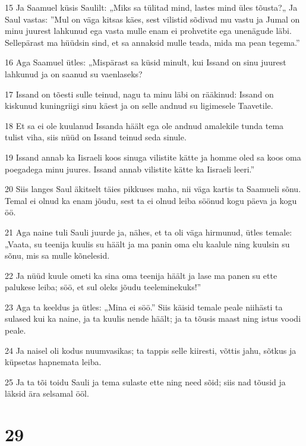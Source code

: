 \par 15 Ja Saamuel küsis Saulilt: „Miks sa tülitad mind, lastes mind üles tõusta?„ Ja Saul vastas: ”Mul on väga kitsas käes, sest vilistid sõdivad mu vastu ja Jumal on minu juurest lahkunud ega vasta mulle enam ei prohvetite ega unenägude läbi. Sellepärast ma hüüdsin sind, et sa annaksid mulle teada, mida ma pean tegema.”
\par 16 Aga Saamuel ütles: „Mispärast sa küsid minult, kui Issand on sinu juurest lahkunud ja on saanud su vaenlaseks?
\par 17 Issand on tõesti sulle teinud, nagu ta minu läbi on rääkinud: Issand on kiskunud kuningriigi sinu käest ja on selle andnud su ligimesele Taavetile.
\par 18 Et sa ei ole kuulanud Issanda häält ega ole andnud amalekile tunda tema tulist viha, siis nüüd on Issand teinud seda sinule.
\par 19 Issand annab ka Iisraeli koos sinuga vilistite kätte ja homme oled sa koos oma poegadega minu juures. Issand annab vilistite kätte ka Iisraeli leeri.”
\par 20 Siis langes Saul äkitselt täies pikkuses maha, nii väga kartis ta Saamueli sõnu. Temal ei olnud ka enam jõudu, sest ta ei olnud leiba söönud kogu päeva ja kogu öö.
\par 21 Aga naine tuli Sauli juurde ja, nähes, et ta oli väga hirmunud, ütles temale: „Vaata, su teenija kuulis su häält ja ma panin oma elu kaalule ning kuulsin su sõnu, mis sa mulle kõnelesid.
\par 22 Ja nüüd kuule ometi ka sina oma teenija häält ja lase ma panen su ette palukese leiba; söö, et sul oleks jõudu teeleminekuks!”
\par 23 Aga ta keeldus ja ütles: „Mina ei söö.” Siis käisid temale peale niihästi ta sulased kui ka naine, ja ta kuulis nende häält; ja ta tõusis maast ning istus voodi peale.
\par 24 Ja naisel oli kodus nuumvasikas; ta tappis selle kiiresti, võttis jahu, sõtkus ja küpsetas hapnemata leiba.
\par 25 Ja ta tõi toidu Sauli ja tema sulaste ette ning need sõid; siis nad tõusid ja läksid ära selsamal ööl.

\chapter{29}

